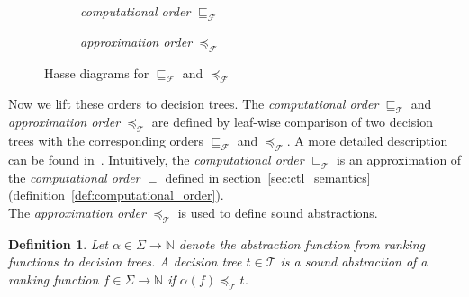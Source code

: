 \documentclass[11pt,a4paper,titlepage]{article}
\newtheorem{definition}{Definition}[section]
\begin{document}
\begin{figure}
    \begin{subfigure}[b]{0.5\textwidth}
        \centering
        \caption{\textit{computational order} $\sqsubseteq_{\mathcal{F}}$}
    \end{subfigure}
    \begin{subfigure}[b]{0.5\textwidth}
        \centering
        \caption{\textit{approximation order} $\preceq_{\mathcal{F}}$}
    \end{subfigure}
    \caption{Hasse diagrams for $\sqsubseteq_{\mathcal{F}}$ and $\preceq_{\mathcal{F}}$
    } 
    \label{fig:function_comp_approx_hasse}
\end{figure}

Now we lift these orders to decision trees. The \textit{computational order} $\sqsubseteq_{\mathcal{T}}$ 
and \textit{approximation order} $\preceq_{\mathcal{T}}$ are defined by leaf-wise comparison of two decision trees with the corresponding orders 
$\sqsubseteq_{\mathcal{F}}$ and $\preceq_{\mathcal{F}}$. A more detailed description can be found in~\cite{UrbanPhd}. 
Intuitively, the \textit{computational order} $\sqsubseteq_{\mathcal{T}}$ is an approximation of the \textit{computational order} $\sqsubseteq$ defined 
in section~\ref{sec:ctl_semantics} (definition~\ref{def:computational_order}).\\

The \textit{approximation order} $\preceq_{\mathcal{T}}$ is used to define sound abstractions.

\begin{definition}\label{def:sound_abstraction}
    Let $\alpha \in \Sigma \rightarrow \mathbb{N}$ denote the abstraction function from ranking functions to decision trees.
    A decision tree $t \in \mathcal{T}$ is a sound abstraction of a ranking function $f \in \Sigma \rightarrow \mathbb{N}$ if
    $\alpha(f) \preceq_{\mathcal{T}} t$.
\end{definition}
\end{document}
